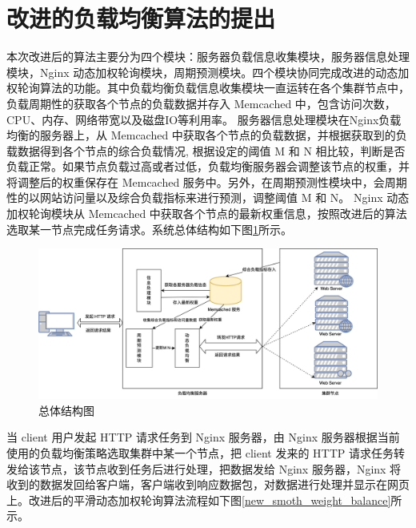 \section{改进的负载均衡算法的提出}
本次改进后的算法主要分为四个模块：服务器负载信息收集模块，服务器信息处理模块，Nginx 动态加权轮询模块，周期预测模块。四个模块协同完成改进的动态加权轮询算法的功能。其中负载均衡负载信息收集模块一直运转在各个集群节点中，负载周期性的获取各个节点的负载数据并存入 Memcached 中，包含访问次数，CPU、内存、网络带宽以及磁盘IO等利用率。
服务器信息处理模块在Nginx负载均衡的服务器上，从 Memcached 中获取各个节点的负载数据，并根据获取到的负载数据得到各个节点的综合负载情况,
根据设定的阈值 M 和 N 相比较，判断是否负载正常。如果节点负载过高或者过低，负载均衡服务器会调整该节点的权重，并将调整后的权重保存在 Memcached 服务中。另外，在周期预测性模块中，会周期性的以网站访问量以及综合负载指标来进行预测，调整阈值 M 和 N。
Nginx 动态加权轮询模块从 Memcached 中获取各个节点的最新权重信息，按照改进后的算法选取某一节点完成任务请求。系统总体结构如下图\ref{total_structure_flow}所示。

\begin{figure}[htbp]
  \centering
  \includegraphics[width=\textwidth]{figures/landbalance_module.png}
  \caption{总体结构图}
  \label{total_structure_flow}
\end{figure}

当 client 用户发起 HTTP 请求任务到 Nginx 服务器，由 Nginx 服务器根据当前使用的负载均衡策略选取集群中某一个节点，把 client 发来的 HTTP 请求任务转发给该节点，该节点收到任务后进行处理，把数据发给 Nginx 服务器，Nginx 将收到的数据发回给客户端，客户端收到响应数据包，对数据进行处理并显示在网页上。改进后的平滑动态加权轮询算法流程如下图\ref{new_smoth_weight_balance}所示。

